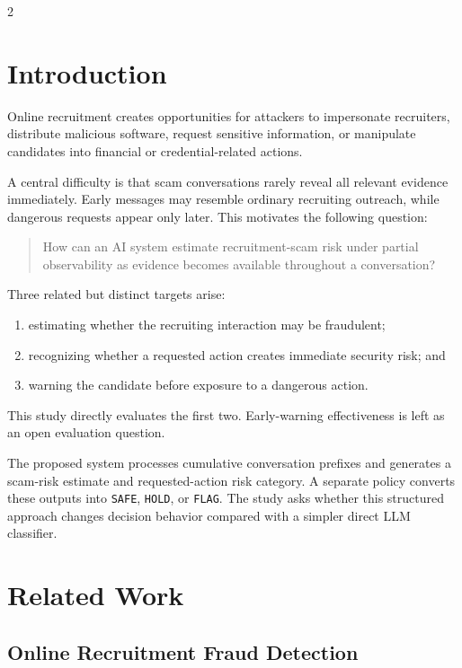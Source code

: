\documentclass{article}
\begin{document}
\begin{multicols}{2}
\fi

\section{Introduction}

Online recruitment creates opportunities for attackers to impersonate recruiters, distribute malicious software, request sensitive information, or manipulate candidates into financial or credential-related actions.

A central difficulty is that scam conversations rarely reveal all relevant evidence immediately. Early messages may resemble ordinary recruiting outreach, while dangerous requests appear only later. This motivates the following question:

\begin{quote}
How can an AI system estimate recruitment-scam risk under partial observability as evidence becomes available throughout a conversation?
\end{quote}

Three related but distinct targets arise:
\begin{enumerate}
    \item estimating whether the recruiting interaction may be fraudulent;
    \item recognizing whether a requested action creates immediate security risk; and
    \item warning the candidate before exposure to a dangerous action.
\end{enumerate}

This study directly evaluates the first two. Early-warning effectiveness is left as an open evaluation question.

The proposed system processes cumulative conversation prefixes and generates a scam-risk estimate and requested-action risk category. A separate policy converts these outputs into \texttt{SAFE}, \texttt{HOLD}, or \texttt{FLAG}. The study asks whether this structured approach changes decision behavior compared with a simpler direct LLM classifier.

\section{Related Work}

\subsection{Online Recruitment Fraud Detection}


\end{multicols}
\end{document}
